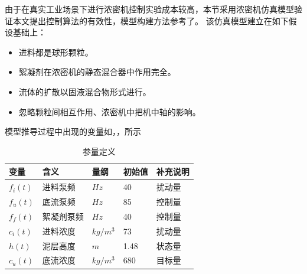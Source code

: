 由于在真实工业场景下进行浓密机控制实验成本较高，本节采用浓密机仿真模型验证本文提出控制算法的有效性，模型构建方法参考了\cite{Chai2016}\cite{KIM2004403}\cite{WangLinyan2017}\cite{WangMeng}\cite{Tang2009}\cite{Wang330}。
该仿真模型建立在如下假设基础上：
\begin{itemize}
    \item 进料都是球形颗粒。
    \item  絮凝剂在浓密机的静态混合器中作用完全。
    \item 流体的扩散以固液混合物形式进行。
    \item 忽略颗粒间相互作用、浓密机中把机中轴的影响。
\end{itemize}
模型推导过程中出现的变量如，，所示
\begin{table}[!ht]
\caption{参量定义} \label{tab:dynamic_variables}
\centering

\begin{tabular}{@{}lllll@{}}
\toprule
 变量                & 含义     & 量纲       & 初始值  & 补充说明 \\ \midrule
$f_{i}(t)$        & 进料泵频   & $Hz$     & 40   & 扰动量  \\
$f_{u}(t)$        & 底流泵频   & $Hz$     & 85   & 控制量  \\
$f_{f}(t)$        & 絮凝剂泵频  & $Hz$     & 40   & 控制量  \\
$c _ { i } ( t )$ & 进料浓度   & $kg/m^3$ & 73   & 扰动量  \\
$h(t)$            & 泥层高度 & $m$      & 1.48 & 状态量  \\
$c_u(t)$          & 底流浓度   & $kg/m^3$ & 680  & 目标量  \\
\bottomrule
\end{tabular}%
\end{table}

